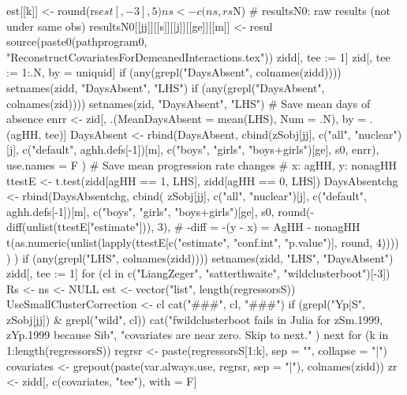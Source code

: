 \begin{Schunk}
\begin{Sinput}
{{{{{{{                est[[k]] <- round(rs$est[, -3], 5)
                ns <- c(ns, rs$N)
              }
              # resultsN0: raw results (not under same obs)
              resultsN0[[jj]][[s]][[j]][[ge]][[m]] <- resul
                source(paste0(pathprogram0, "ReconstructCovariatesForDemeanedInteractions.tex")) 
              zidd[, tee := 1]
              zid[, tee := 1:.N, by = uniquid]
              if (any(grepl("DaysAbsent", colnames(zidd)))) setnames(zidd, "DaysAbsent", "LHS")
              if (any(grepl("DaysAbsent", colnames(zid)))) setnames(zid, "DaysAbsent", "LHS")
              # Save mean days of absence
              enrr <- zid[, .(MeanDaysAbsent = mean(LHS), Num = .N), by = .(agHH, tee)]
              DaysAbsent <- rbind(DaysAbsent, 
                cbind(zSobj[jj], c("all", "nuclear")[j], c("default", aghh.defs[-1])[m], 
                  c("boys", "girls", "boys+girls")[ge],
                  s0, enrr),
                use.names = F
              )
              # Save mean progression rate changes
              # x: agHH, y: nonagHH
              ttestE <- t.test(zidd[agHH == 1, LHS], zidd[agHH == 0, LHS])
              DaysAbsentchg <- rbind(DaysAbsentchg, 
                cbind(
                    zSobj[jj], c("all", "nuclear")[j], c("default", aghh.defs[-1])[m], 
                    c("boys", "girls", "boys+girls")[ge],
                    s0, round(-diff(unlist(ttestE["estimate"])), 3), # -diff = -(y - x) = AgHH - nonagHH
                    t(as.numeric(unlist(lapply(ttestE[c("estimate", "conf.int", "p.value")], round, 4))))
                    )
                  )
              if (any(grepl("LHS", colnames(zidd)))) setnames(zidd, "LHS", "DaysAbsent")
              zidd[, tee := 1]
              for (cl in c("LiangZeger", "satterthwaite", "wildclusterboot")[-3]) 
              {
                Rs <- ns <- NULL
                est <- vector("list", length(regressorsS))
                UseSmallClusterCorrection <- cl 
                cat("\n\n###", cl, "###\n\n")
                if (grepl("Yp|S", zSobj[jj]) & grepl("wild", cl)) {
                  cat("fwildclusterboot fails in Julia for zSm.1999, zYp.1999 because Sib", 
                    "covariates are near zero. Skip to next.\n\n" )
                  next
                }
                for (k in 1:length(regressorsS))
                {
                  regrsr <- paste(regressorsS[1:k], sep = "", collapse = "|")
                  covariates <- grepout(paste(var.always.use, regrsr, sep = "|"), 
                    colnames(zidd))
                  zr <- zidd[, c(covariates, "tee"), with = F]
}}}}}}}}
\end{Sinput}
\end{Schunk}
